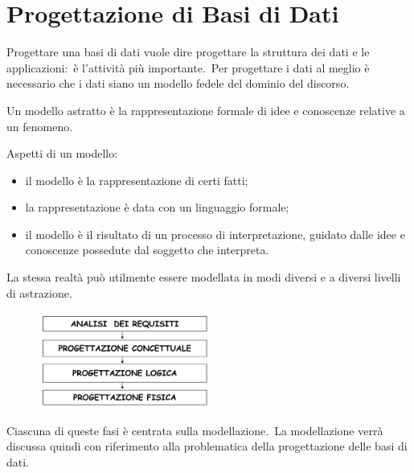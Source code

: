 \chapter{Progettazione di Basi di Dati}

Progettare una basi di dati vuole dire progettare la struttura dei dati e le applicazioni:\ è l'attività più importante.\
Per progettare i dati al meglio è necessario che i dati siano un modello fedele del dominio del discorso.

\begin{definition}
	Un modello astratto è la rappresentazione formale di idee e conoscenze relative a un fenomeno.\
\end{definition}

\noindent Aspetti di un modello:
\begin{itemize}
	\item il modello è la rappresentazione di certi fatti;
	\item la rappresentazione è data con un linguaggio formale;
	\item il modello è il risultato di un processo di interpretazione, guidato dalle idee e conoscenze possedute dal soggetto che interpreta.
\end{itemize}
La stessa realtà può utilmente essere modellata in modi diversi e a diversi livelli di astrazione.\

\begin{figure}[H]
	\centering
	\includegraphics[width=0.5\textwidth]{immagini/Progettazione.png}
\end{figure}
\noindent Ciascuna di queste fasi è centrata sulla modellazione.\
La modellazione verrà discussa quindi con riferimento alla problematica della progettazione delle basi di dati.\

